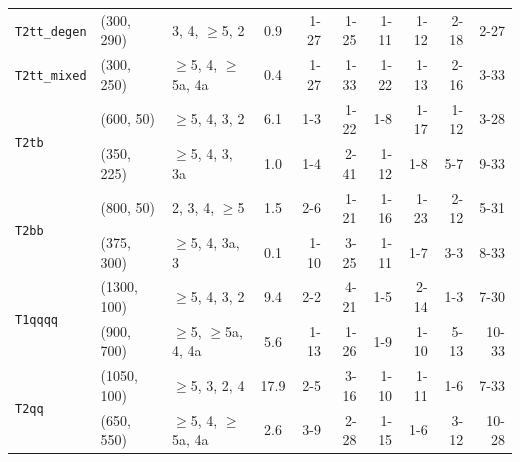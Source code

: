 \begin{table}[tb]
\begin{tabular}{ lllcrrrrrr }
    \multirow{1}{*}{\texttt{T2tt\_degen}}                                                                                                                
                                               & (300, 290)  & 3, 4, $\geq$5, 2         & \phantom{1}0.9 & 1-27  & 1-25    & 1-11 & 1-12 & 2-18 & 2-27  \\ [0.5ex]
    \multirow{1}{*}{\texttt{T2tt\_mixed}}                                                                                                                
                                               & (300, 250)  & $\geq$5, 4, $\geq$5a, 4a & \phantom{1}0.4 & 1-27  & 1-33    & 1-22 & 1-13 & 2-16 & 3-33  \\ [0.5ex]
    \multirow{2}{*}{\texttt{T2tb}}                                                                                                                       
                                               & (600, 50)   & $\geq$5, 4, 3, 2         & \phantom{1}6.1 & 1-3   & 1-22    & 1-8  & 1-17 & 1-12 & 3-28  \\
                                               & (350, 225)  & $\geq$5, 4, 3, 3a        & \phantom{1}1.0 & 1-4   & 2-41    & 1-12 & 1-8  & 5-7  & 9-33  \\ [0.5ex]
    \multirow{2}{*}{\texttt{T2bb}}                                                                                                                       
                                               & (800, 50)   & 2, 3, 4, $\geq$5         & \phantom{1}1.5 & 2-6   & 1-21    & 1-16 & 1-23 & 2-12 & 5-31  \\
                                               & (375, 300)  & $\geq$5, 4, 3a, 3        & \phantom{1}0.1 & 1-10  & 3-25    & 1-11 & 1-7  & 3-3  & 8-33  \\ [0.5ex]
    \multirow{2}{*}{\texttt{T1qqqq}}                                                                                                                     
                                               & (1300, 100) & $\geq$5, 4, 3, 2         & \phantom{1}9.4 & 2-2   & 4-21    & 1-5  & 2-14 & 1-3  & 7-30  \\
                                               & (900, 700)  & $\geq$5, $\geq$5a, 4, 4a & \phantom{1}5.6 & 1-13  & 1-26    & 1-9  & 1-10 & 5-13 & 10-33 \\ [0.5ex]
    \multirow{2}{*}{\texttt{T2qq}}                                                                                                                       
                                               & (1050, 100) & $\geq$5, 3, 2, 4         & 17.9           & 2-5   & 3-16    & 1-10 & 1-11 & 1-6  & 7-33  \\
                                               & (650, 550)  & $\geq$5, 4, $\geq$5a, 4a & \phantom{1}2.6 & 3-9   & 2-28    & 1-15 & 1-6  & 3-12 & 10-28 \\ [0.5ex]
     \hline
  \end{tabular}
\end{table}

